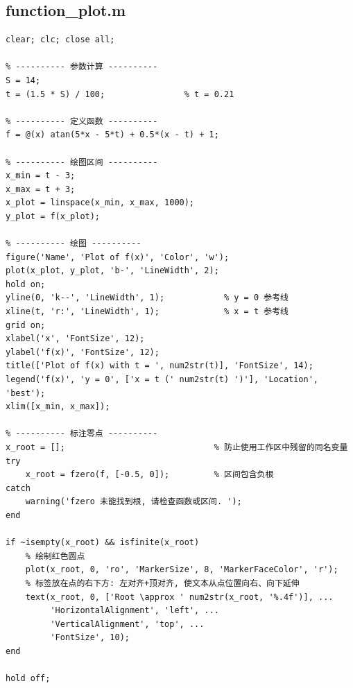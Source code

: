 \documentclass[12pt,a4paper]{ctexart}
\begin{document}
\subsection{function\_plot.m}\label{code:function_plot}
\begin{lstlisting}
clear; clc; close all;

% ---------- 参数计算 ----------
S = 14;
t = (1.5 * S) / 100;                % t = 0.21

% ---------- 定义函数 ----------
f = @(x) atan(5*x - 5*t) + 0.5*(x - t) + 1;

% ---------- 绘图区间 ----------
x_min = t - 3;
x_max = t + 3;
x_plot = linspace(x_min, x_max, 1000);
y_plot = f(x_plot);

% ---------- 绘图 ----------
figure('Name', 'Plot of f(x)', 'Color', 'w');
plot(x_plot, y_plot, 'b-', 'LineWidth', 2);
hold on;
yline(0, 'k--', 'LineWidth', 1);            % y = 0 参考线
xline(t, 'r:', 'LineWidth', 1);             % x = t 参考线
grid on;
xlabel('x', 'FontSize', 12);
ylabel('f(x)', 'FontSize', 12);
title(['Plot of f(x) with t = ', num2str(t)], 'FontSize', 14);
legend('f(x)', 'y = 0', ['x = t (' num2str(t) ')'], 'Location', 'best');
xlim([x_min, x_max]);

% ---------- 标注零点 ----------
x_root = [];                              % 防止使用工作区中残留的同名变量
try
    x_root = fzero(f, [-0.5, 0]);         % 区间包含负根
catch
    warning('fzero 未能找到根, 请检查函数或区间. ');
end

if ~isempty(x_root) && isfinite(x_root)
    % 绘制红色圆点
    plot(x_root, 0, 'ro', 'MarkerSize', 8, 'MarkerFaceColor', 'r');
    % 标签放在点的右下方: 左对齐+顶对齐, 使文本从点位置向右、向下延伸
    text(x_root, 0, ['Root \approx ' num2str(x_root, '%.4f')], ...
         'HorizontalAlignment', 'left', ...
         'VerticalAlignment', 'top', ...
         'FontSize', 10);
end

hold off;
\end{lstlisting}
\end{document}
